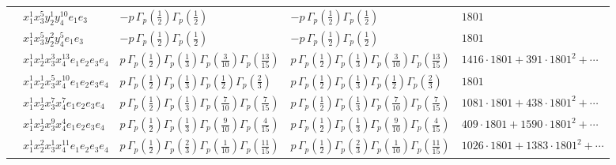 \documentclass[11pt]{article}
\begin{document}
\begin{table}[ht]
{\begin{tabular}{@{}lllll@{}}
 & $x_{1}^{1} x_{3}^{5} y_{2}^{1} y_{4}^{10} e_{1} e_{3}$ & $- p \, \Gamma_p \left( \frac{1}{2} \right) \Gamma_p \left( \frac{1}{2} \right)$ & $- p \, \Gamma_p \left( \frac{1}{2} \right) \Gamma_p \left( \frac{1}{2} \right)$ & $1801$ \\
 & $x_{1}^{1} x_{3}^{5} y_{2}^{2} y_{4}^{5} e_{1} e_{3}$ & $- p \, \Gamma_p \left( \frac{1}{2} \right) \Gamma_p \left( \frac{1}{2} \right)$ & $- p \, \Gamma_p \left( \frac{1}{2} \right) \Gamma_p \left( \frac{1}{2} \right)$ & $1801$ \\
 & $x_{1}^{1} x_{2}^{1} x_{3}^{3} x_{4}^{13}  e_{1} e_{2} e_{3} e_{4}$ & $p \, \Gamma_p \left( \frac{1}{2} \right) \Gamma_p \left( \frac{1}{3} \right) \Gamma_p \left( \frac{3}{10} \right) \Gamma_p \left( \frac{13}{15} \right)$ & $p \, \Gamma_p \left( \frac{1}{2} \right) \Gamma_p \left( \frac{1}{3} \right) \Gamma_p \left( \frac{3}{10} \right) \Gamma_p \left( \frac{13}{15} \right)$ & $1416{\cdot}1801{+}391{\cdot}1801^{2}{+}\cdots$ \\
 & $x_{1}^{1} x_{2}^{1} x_{3}^{5} x_{4}^{10}  e_{1} e_{2} e_{3} e_{4}$ & $p \, \Gamma_p \left( \frac{1}{2} \right) \Gamma_p \left( \frac{1}{3} \right) \Gamma_p \left( \frac{1}{2} \right) \Gamma_p \left( \frac{2}{3} \right)$ & $p \, \Gamma_p \left( \frac{1}{2} \right) \Gamma_p \left( \frac{1}{3} \right) \Gamma_p \left( \frac{1}{2} \right) \Gamma_p \left( \frac{2}{3} \right)$ & $1801$ \\
 & $x_{1}^{1} x_{2}^{1} x_{3}^{7} x_{4}^{7}  e_{1} e_{2} e_{3} e_{4}$ & $p \, \Gamma_p \left( \frac{1}{2} \right) \Gamma_p \left( \frac{1}{3} \right) \Gamma_p \left( \frac{7}{10} \right) \Gamma_p \left( \frac{7}{15} \right)$ & $p \, \Gamma_p \left( \frac{1}{2} \right) \Gamma_p \left( \frac{1}{3} \right) \Gamma_p \left( \frac{7}{10} \right) \Gamma_p \left( \frac{7}{15} \right)$ & $1081{\cdot}1801{+}438{\cdot}1801^{2}{+}\cdots$ \\
 & $x_{1}^{1} x_{2}^{1} x_{3}^{9} x_{4}^{4}  e_{1} e_{2} e_{3} e_{4}$ & $p \, \Gamma_p \left( \frac{1}{2} \right) \Gamma_p \left( \frac{1}{3} \right) \Gamma_p \left( \frac{9}{10} \right) \Gamma_p \left( \frac{4}{15} \right)$ & $p \, \Gamma_p \left( \frac{1}{2} \right) \Gamma_p \left( \frac{1}{3} \right) \Gamma_p \left( \frac{9}{10} \right) \Gamma_p \left( \frac{4}{15} \right)$ & $409{\cdot}1801{+}1590{\cdot}1801^{2}{+}\cdots$ \\
 & $x_{1}^{1} x_{2}^{2} x_{3}^{1} x_{4}^{11}  e_{1} e_{2} e_{3} e_{4}$ & $p \, \Gamma_p \left( \frac{1}{2} \right) \Gamma_p \left( \frac{2}{3} \right) \Gamma_p \left( \frac{1}{10} \right) \Gamma_p \left( \frac{11}{15} \right)$ & $p \, \Gamma_p \left( \frac{1}{2} \right) \Gamma_p \left( \frac{2}{3} \right) \Gamma_p \left( \frac{1}{10} \right) \Gamma_p \left( \frac{11}{15} \right)$ & $1026{\cdot}1801{+}1383{\cdot}1801^{2}{+}\cdots$ \\

\end{tabular}}
\end{table}
\end{document}
